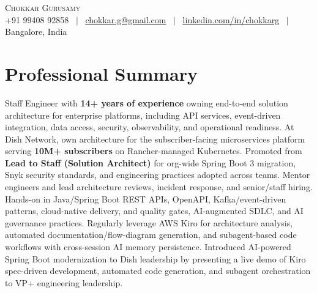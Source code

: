 \documentclass[letterpaper,11pt]{article}
\begin{document}
\begin{center}
    {\Huge \scshape Chokkar Gurusamy} \\ \vspace{4pt}
    \small +91 99408 92858 ~$|$~
    \href{mailto:chokkar.g@gmail.com}{\underline{chokkar.g@gmail.com}} ~$|$~
    \href{https://linkedin.com/in/chokkarg}{\underline{linkedin.com/in/chokkarg}} ~$|$~
    Bangalore, India
    \vspace{-8pt}
\end{center}

\section{Professional Summary}
{\small
Staff Engineer with \textbf{14+ years of experience} owning end-to-end solution architecture for enterprise platforms, including API services, event-driven integration, data access, security, observability, and operational readiness. At Dish Network, own architecture for the subscriber-facing microservices platform serving \textbf{10M+ subscribers} on Rancher-managed Kubernetes. Promoted from \textbf{Lead to Staff (Solution Architect)} for org-wide Spring Boot 3 migration, Snyk security standards, and engineering practices adopted across teams. Mentor engineers and lead architecture reviews, incident response, and senior/staff hiring. Hands-on in Java/Spring Boot REST APIs, OpenAPI, Kafka/event-driven patterns, cloud-native delivery, and quality gates, AI-augmented SDLC, and AI governance practices. Regularly leverage AWS Kiro for architecture analysis, automated documentation/flow-diagram generation, and subagent-based code workflows with cross-session AI memory persistence. Introduced AI-powered Spring Boot modernization to Dish leadership by presenting a live demo of Kiro spec-driven development, automated code generation, and subagent orchestration to VP+ engineering leadership.
}
\vspace{-8pt}

\end{document}
